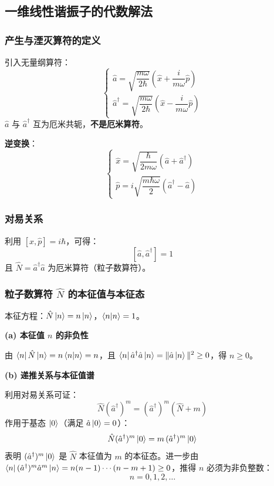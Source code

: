 \documentclass[12pt,a4paper]{article}
\begin{document}
\subsection{一维线性谐振子的代数解法}

\subsubsection{产生与湮灭算符的定义}

引入无量纲算符：
\[
\begin{cases}
\hat{a}=\sqrt{\dfrac{m\omega}{2\hbar}}\left(\hat{x}+\dfrac{i}{m\omega}\hat{p}\right)\\[8pt]
\hat{a}^\dagger=\sqrt{\dfrac{m\omega}{2\hbar}}\left(\hat{x}-\dfrac{i}{m\omega}\hat{p}\right)
\end{cases}
\]
$\hat{a}$ 与 $\hat{a}^\dagger$ 互为厄米共轭，\textbf{不是厄米算符}。

\textbf{逆变换}：
\[
\begin{cases}
\hat{x}=\sqrt{\dfrac{\hbar}{2m\omega}}\left(\hat{a}+\hat{a}^\dagger\right)\\[8pt]
\hat{p}=i\sqrt{\dfrac{m\hbar\omega}{2}}\left(\hat{a}^\dagger-\hat{a}\right)
\end{cases}
\]

\subsubsection{对易关系}

利用 $[\hat{x},\hat{p}]=i\hbar$，可得：
\[
[\hat{a},\hat{a}^\dagger]=1
\]
且 $\hat{N}=\hat{a}^\dagger\hat{a}$ 为厄米算符（粒子数算符）。

\subsubsection{\texorpdfstring{粒子数算符 $\hat{N}$ 的本征值与本征态}{粒子数算符的本征值与本征态}}

本征方程：$\hat{N}\ket{n}=n\ket{n}$，$\braket{n|n}=1$。

\textbf{(a) 本征值 $n$ 的非负性}

由 $\bra{n}\hat{N}\ket{n}=n\braket{n|n}=n$，且 $\bra{n}\hat{a}^\dagger\hat{a}\ket{n}=\|\hat{a}\ket{n}\|^2\ge 0$，得 $n\ge 0$。

\textbf{(b) 递推关系与本征值谱}

利用对易关系可证：
\[
\hat{N}(\hat{a}^\dagger)^m=(\hat{a}^\dagger)^m(\hat{N}+m)
\]
作用于基态 $\ket{0}$（满足 $\hat{a}\ket{0}=0$）：
\[
\hat{N}(\hat{a}^\dagger)^m\ket{0}=m\,(\hat{a}^\dagger)^m\ket{0}
\]
表明 $(\hat{a}^\dagger)^m\ket{0}$ 是 $\hat{N}$ 本征值为 $m$ 的本征态。进一步由 $\bra{n}(\hat{a}^\dagger)^m\hat{a}^m\ket{n}=n(n-1)\cdots(n-m+1)\ge 0$，推得 $n$ 必须为非负整数：
\[
n=0,1,2,\ldots
\]
\end{document}
